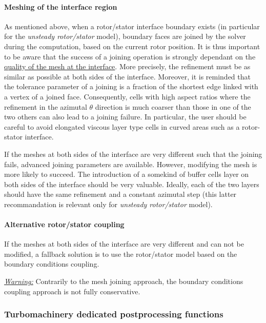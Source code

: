\paragraph{Meshing of the interface region}\label{tbm_user_bpg_mesh}

As mentioned above, when a rotor/stator interface boundary exists (in
particular for the \emph{unsteady rotor/stator} model), boundary faces
are joined by the solver during the computation, based on the current
rotor position. It is thus important to be aware that the success of
a joining operation is strongly dependant on the
\underline{quality of the mesh at the interface}. More precisely,
the refinement must be as similar as possible at both sides of the
interface. Moreover, it is reminded that the tolerance parameter of
a joining is a fraction of the shortest edge linked with a vertex of
a joined face. Consequently, cells with high aspect ratios where the
refinement in the azimutal $\theta$ direction is much coarser than
those in one of the two others can also lead to a joining failure.
In particular, the user should be careful to avoid elongated
viscous layer type cells in curved areas such as a rotor-stator interface.

If the meshes at both sides of the interface are very different
such that the joining fails, advanced joining parameters are
available. However, modifying the mesh is more likely to
succeed. The introduction of a somekind of buffer cells layer on
both sides of the interface should be very valuable. Ideally, each
of the two layers should have the same refinement and a constant
azimutal step (this latter recommandation is relevant only for
\emph{unsteady rotor/stator} model).

\paragraph{Alternative rotor/stator coupling}\label{tbm_user_bpg_cpl}

If the meshes at both sides of the interface are very different and
can not be modified, a fallback solution is to use the rotor/stator model
based on the boundary conditions coupling.

\underline{\emph{Warning:}} Contrarily to the mesh joining approach, the
boundary conditions coupling approach is not fully conservative.

\subsubsection{Turbomachinery dedicated postprocessing functions}\label{tbm_user_post}

